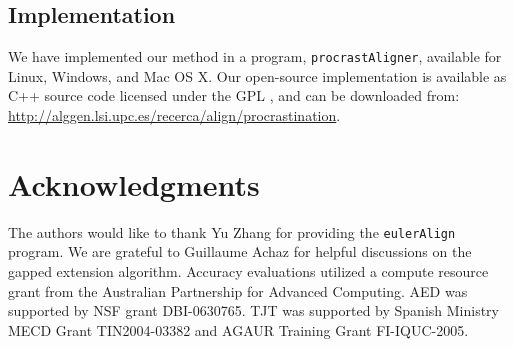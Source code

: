 \documentclass{llncs}
\begin{document}
\subsection{Implementation}
We have implemented our method in a program, \texttt{procrastAligner},
available for Linux, Windows, and Mac OS X. Our open-source
implementation is available as C++ source code licensed under the GPL , and can be downloaded from: \\
\url{http://alggen.lsi.upc.es/recerca/align/procrastination}.

\section{ Acknowledgments }
The authors would like to thank Yu Zhang for providing the
\texttt{eulerAlign} program. We are grateful to Guillaume Achaz for
helpful discussions on the gapped extension algorithm. Accuracy
evaluations utilized a compute resource grant from the Australian
Partnership for Advanced Computing.  AED was supported by NSF grant
DBI-0630765. TJT was supported by Spanish Ministry MECD Grant
TIN2004-03382 and AGAUR Training Grant FI-IQUC-2005.




\end{document}
